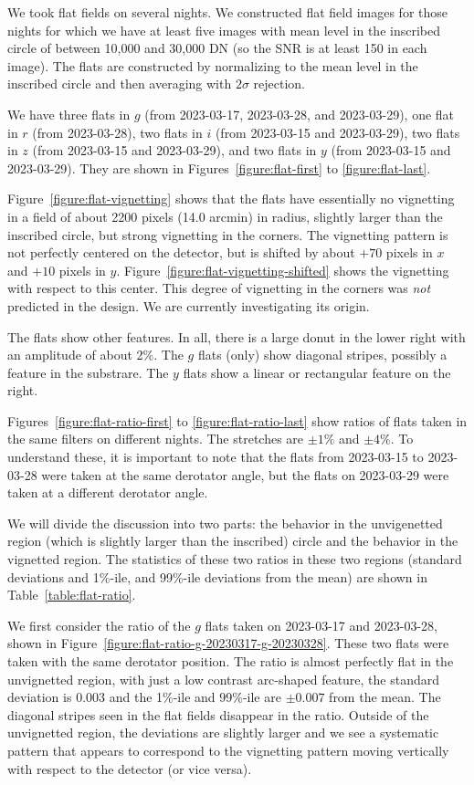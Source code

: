 \documentclass{article}
\begin{document}
We took flat fields on several nights. We constructed flat field images for those nights for which we have at least five images with mean level in the inscribed circle of between 10,000 and 30,000 DN (so the SNR is at least 150 in each image). The flats are constructed by normalizing to the mean level in the inscribed circle and then averaging with $2\sigma$ rejection.

We have three flats in $g$ (from 2023-03-17, 2023-03-28, and 2023-03-29), one flat in $r$ (from 2023-03-28), two flats in $i$ (from 2023-03-15 and 2023-03-29), two flats in $z$ (from 2023-03-15 and 2023-03-29), and two flats in $y$ (from 2023-03-15 and 2023-03-29). They are shown in Figures~\ref{figure:flat-first} to \ref{figure:flat-last}.

Figure~\ref{figure:flat-vignetting} shows that the flats have essentially no vignetting in a field of about 2200 pixels (14.0 arcmin) in radius, slightly larger than the inscribed circle, but strong vignetting in the corners. The vignetting pattern is not perfectly centered on the detector, but is shifted by about $+70$ pixels in $x$ and $+10$ pixels in $y$. Figure~\ref{figure:flat-vignetting-shifted} shows the vignetting with respect to this center. This degree of vignetting in the corners was \emph{not} predicted in the design. We are currently investigating its origin.

The flats show other features. In all, there is a large donut in the lower right with an amplitude of about 2\%. The $g$ flats (only) show diagonal stripes, possibly a feature in the substrare. The $y$ flats show a linear or rectangular feature on the right.

Figures~\ref{figure:flat-ratio-first} to \ref{figure:flat-ratio-last} show ratios of flats taken in the same filters on different nights. The stretches are $\pm1\%$ and $\pm4\%$. To understand these, it is important to note that the flats from 2023-03-15 to 2023-03-28 were taken at the same derotator angle, but the flats on 2023-03-29 were taken at a different derotator angle.

We will divide the discussion into two parts: the behavior in the unvigenetted region (which is slightly larger than the inscribed) circle and the behavior in the vignetted region. The statistics of these two ratios in these two regions (standard deviations and 1\%-ile, and 99\%-ile deviations from the mean) are shown in Table~\ref{table:flat-ratio}.

We first consider the ratio of the $g$ flats taken on 2023-03-17 and 2023-03-28, shown in Figure~\ref{figure:flat-ratio-g-20230317-g-20230328}. These two flats were taken with the same derotator position. The ratio is almost perfectly flat in the unvignetted region, with just a low contrast arc-shaped feature, the standard deviation is $0.003$ and the 1\%-ile and 99\%-ile are $\pm0.007$ from the mean. The diagonal stripes seen in the flat fields disappear in the ratio. Outside of the unvignetted region, the deviations are slightly larger and we see a systematic pattern that appears to correspond to the vignetting pattern moving vertically with respect to the detector (or vice versa).
\end{document}
